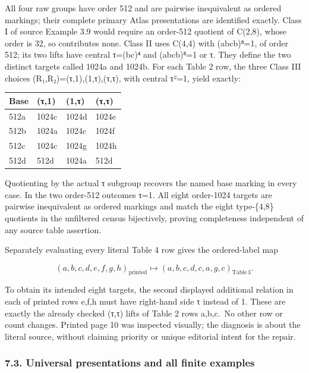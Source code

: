 \documentclass[
  11pt,
  a4paper,
]{article}
\newcounter{none} %
\begin{document}
All four raw groups have order 512 and are pairwise inequivalent as
ordered markings; their complete primary Atlas presentations are
identified exactly. Class I of source Example 3.9 would require an
order-512 quotient of C(2,8), whose order is 32, so contributes none.
Class II uses C(4,4) with (abcb)⁸=1, of order 512; its two lifts have
central τ=(bc)⁴ and (abcb)⁸=1 or τ. They define the two distinct targets
called 1024a and 1024b. For each Table 2 row, the three Class III
choices (R₁,R₂)=(τ,1),(1,τ),(τ,τ), with central τ²=1, yield exactly:

{\def\LTcaptype{none} %
\begin{longtable}[]{@{}llll@{}}
\toprule\noalign{}
Base & (τ,1) & (1,τ) & (τ,τ) \\
\midrule\noalign{}
\endhead
\bottomrule\noalign{}
\endlastfoot
512a & 1024c & 1024d & 1024e \\
512b & 1024a & 1024c & 1024f \\
512c & 1024c & 1024g & 1024h \\
512d & 512d & 1024a & 512d \\
\end{longtable}
}

Quotienting by the actual τ subgroup recovers the named base marking in
every case. In the two order-512 outcomes τ=1. All eight order-1024
targets are pairwise inequivalent as ordered markings and match the
eight type-\{4,8\} quotients in the unfiltered census bijectively,
proving completeness independent of any source table assertion.

Separately evaluating every literal Table 4 row gives the ordered-label
map

\[
(a,b,c,d,e,f,g,h)_{\mathrm{printed}}
\longmapsto(a,b,c,d,c,a,g,c)_{\mathrm{Table\,3}}.
\tag{N2}
\]

To obtain its intended eight targets, the second displayed additional
relation in each of printed rows e,f,h must have right-hand side τ
instead of 1. These are exactly the already checked (τ,τ) lifts of Table
2 rows a,b,c.~No other row or count changes. Printed page 10 was
inspected visually; the diagnosis is about the literal source, without
claiming priority or unique editorial intent for the repair.

\subsubsection{7.3. Universal presentations and all finite
examples}\label{universal-presentations-and-all-finite-examples}
\end{document}
